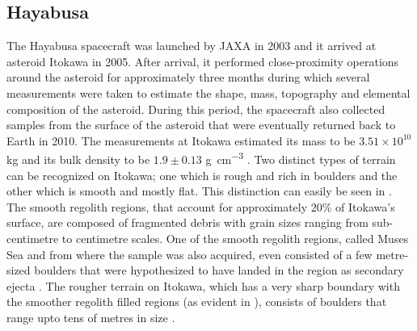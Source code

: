 \subsection{Hayabusa}
\label{subsec:hayabusa_heritage}
The Hayabusa spacecraft was launched by \gls{JAXA} in 2003 and it arrived at asteroid Itokawa in 2005. After arrival, it performed close-proximity operations around the asteroid for approximately three months during which several measurements were taken to estimate the shape, mass, topography and elemental composition of the asteroid. During this period, the spacecraft also collected samples from the surface of the asteroid that were eventually returned back to Earth in 2010. The measurements at Itokawa estimated its mass to be $3.51 \times 10^{10}$ \si{\kilo\gram} and its bulk density to be $1.9 \pm 0.13$ \si{\gram\per\centi\metre\cubed} \parencite{fujiwara2006ItokawaHayabusa}.
%
\newline\newline
%
Two distinct types of terrain can be recognized on Itokawa; one which is rough and rich in boulders and the other which is smooth and mostly flat. This distinction can easily be seen in . The smooth regolith regions, that account for approximately 20\% of Itokawa's surface, are composed of fragmented debris with grain sizes ranging from sub-centimetre to centimetre scales. One of the smooth regolith regions, called Muses Sea and from where the sample was also acquired, even consisted of a few metre-sized boulders that were hypothesized to have landed in the region as secondary ejecta \parencite{miyamotoItokawaRegolith}. The rougher terrain on Itokawa, which has a very sharp boundary with the smoother regolith filled regions (as evident in ), consists of boulders that range upto tens of metres in size \parencite{fujiwara2006ItokawaHayabusa}.

